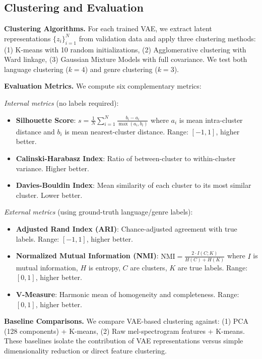 \documentclass[10pt,twocolumn]{article}
\begin{document}
\subsection{Clustering and Evaluation}

\textbf{Clustering Algorithms.} For each trained VAE, we extract latent representations $\{z_i\}_{i=1}^N$ from validation data and apply three clustering methods: (1) K-means with 10 random initializations, (2) Agglomerative clustering with Ward linkage, (3) Gaussian Mixture Models with full covariance. We test both language clustering ($k=4$) and genre clustering ($k=3$).

\textbf{Evaluation Metrics.} We compute six complementary metrics:

\emph{Internal metrics} (no labels required):
\begin{itemize}
    \item \textbf{Silhouette Score}: $s = \frac{1}{N}\sum_{i=1}^N \frac{b_i - a_i}{\max(a_i, b_i)}$ where $a_i$ is mean intra-cluster distance and $b_i$ is mean nearest-cluster distance. Range: $[-1, 1]$, higher better.
    \item \textbf{Calinski-Harabasz Index}: Ratio of between-cluster to within-cluster variance. Higher better.
    \item \textbf{Davies-Bouldin Index}: Mean similarity of each cluster to its most similar cluster. Lower better.
\end{itemize}

\emph{External metrics} (using ground-truth language/genre labels):
\begin{itemize}
    \item \textbf{Adjusted Rand Index (ARI)}: Chance-adjusted agreement with true labels. Range: $[-1, 1]$, higher better.
    \item \textbf{Normalized Mutual Information (NMI)}: $\text{NMI} = \frac{2 \cdot I(C; K)}{H(C) + H(K)}$ where $I$ is mutual information, $H$ is entropy, $C$ are clusters, $K$ are true labels. Range: $[0, 1]$, higher better.
    \item \textbf{V-Measure}: Harmonic mean of homogeneity and completeness. Range: $[0, 1]$, higher better.
\end{itemize}

\textbf{Baseline Comparisons.} We compare VAE-based clustering against: (1) PCA (128 components) + K-means, (2) Raw mel-spectrogram features + K-means. These baselines isolate the contribution of VAE representations versus simple dimensionality reduction or direct feature clustering.
\end{document}
